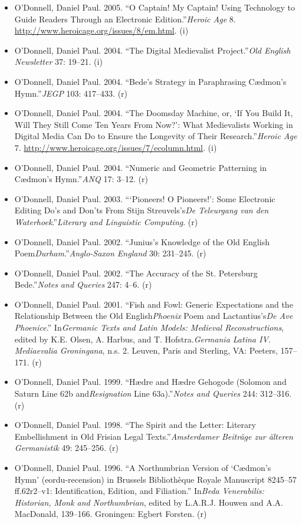\documentclass[12pt]{article}
\begin{document}
\begin{itemize}
  \item O'Donnell, Daniel Paul. 2005. “O Captain! My Captain! Using Technology to Guide Readers Through an Electronic Edition.”\textit{Heroic Age} 8. \url{http://www.heroicage.org/issues/8/em.html}. (i)
  \item O'Donnell, Daniel Paul. 2004. “The Digital Medievalist Project.”\textit{Old English Newsletter} 37: 19–21. (i)
  \item O'Donnell, Daniel Paul. 2004. “Bede’s Strategy in Paraphrasing Cædmon’s Hymn.”\textit{JEGP} 103: 417–433. (r)
  \item O'Donnell, Daniel Paul. 2004. “The Doomsday Machine, or, ‘If You Build It, Will They Still Come Ten Years From Now?’: What Medievalists Working in Digital Media Can Do to Ensure the Longevity of Their Research.”\textit{Heroic Age} 7. \url{http://www.heroicage.org/issues/7/ecolumn.html}. (i)
  \item O'Donnell, Daniel Paul. 2004. “Numeric and Geometric Patterning in Cædmon’s Hymn.”\textit{ANQ} 17: 3–12. (r)
  \item O'Donnell, Daniel Paul. 2003. “‘Pioneers! O Pioneers!’: Some Electronic Editing Do’s and Don’ts From Stijn Streuvels’s\textit{De Teleurgang van den Waterhoek}.”\textit{Literary and Linguistic Computing}. (r)
  \item O'Donnell, Daniel Paul. 2002. “Junius’s Knowledge of the Old English Poem\textit{Durham}.”\textit{Anglo-Saxon England} 30: 231–245. (r)
  \item O'Donnell, Daniel Paul. 2002. “The Accuracy of the St. Petersburg Bede.”\textit{Notes and Queries} 247: 4–6. (r)
  \item O'Donnell, Daniel Paul. 2001. “Fish and Fowl: Generic Expectations and the Relationship Between the Old English\textit{Phoenix} Poem and Lactantius’s\textit{De Ave Phoenice}.” In\textit{Germanic Texts and Latin Models: Medieval Reconstructions}, edited by K.E. Olsen, A. Harbus, and T. Hofstra.\textit{Germania Latina IV. Mediaevalia Groningana}, n.s. 2. Leuven, Paris and Sterling, VA: Peeters, 157–171. (r)
  \item O'Donnell, Daniel Paul. 1999. “Hædre and Hædre Gehogode (Solomon and Saturn Line 62b and\textit{Resignation} Line 63a).”\textit{Notes and Queries} 244: 312–316. (r)
  \item O'Donnell, Daniel Paul. 1998. “The Spirit and the Letter: Literary Embellishment in Old Frisian Legal Texts.”\textit{Amsterdamer Beiträge zur älteren Germanistik} 49: 245–256. (r)
  \item O'Donnell, Daniel Paul\*. 1996. “A Northumbrian Version of ‘Cædmon’s Hymn’ (eordu-recension) in Brussels Bibliothèque Royale Manuscript 8245–57 ff.62r2–v1: Identification, Edition, and Filiation.” In\textit{Beda Venerabilis: Historian, Monk and Northumbrian}, edited by L.A.R.J. Houwen and A.A. MacDonald, 139–166. Groningen: Egbert Forsten. (r)

\end{itemize}
\end{document}
